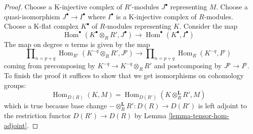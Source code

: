 \documentclass[10pt,a4paper]{amsart}
\theoremstyle{plain}
\theoremstyle{definition}
\theoremstyle{remark}
\numberwithin{equation}{subsection}
\def\Hom{\mathop{\mathrm{Hom}}\nolimits}
\begin{document}
\begin{proof}
Choose a K-injective complex of $R'$-modules $J^\bullet$ representing $M$. 
Choose a quasi-isomorphism $J^\bullet \to I^\bullet$ where $I^\bullet$
is a K-injective complex of $R$-modules. Choose a K-flat complex
$K^\bullet$ of $R$-modules representing $K$. Consider the map
$$
\Hom^\bullet(K^\bullet \otimes_R R', J^\bullet)
\longrightarrow
\Hom^\bullet(K^\bullet, I^\bullet)
$$
The map on degree $n$ terms is given by the map
$$
\prod\nolimits_{n = p + q} \Hom_{R'}(K^{-q} \otimes_R R', J^p)
\longrightarrow
\prod\nolimits_{n = p + q} \Hom_R(K^{-q}, I^p)
$$
coming from precomposing by $K^{-q} \to K^{-q} \otimes_R R'$
and postcomposing by $J^p \to I^p$. To finish the proof it suffices
to show that we get isomorphisms on cohomology groups:
$$
\Hom_{D(R)}(K, M) = \Hom_{D(R')}(K \otimes_R^\mathbf{L} R', M)
$$
which is true because base change $- \otimes_R^\mathbf{L} R' : D(R) \to D(R')$
is left adjoint to the restriction functor $D(R') \to D(R)$ by
Lemma \ref{lemma-tensor-hom-adjoint}.
\end{proof}
\end{document}
